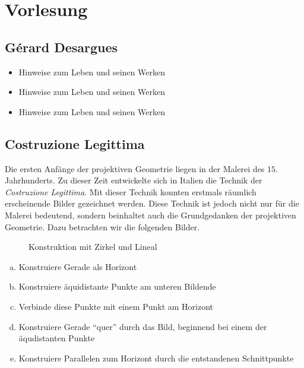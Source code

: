 
\section{Vorlesung}

\subsection*{Gérard Desargues}

\begin{itemize}
    \item Hinweise zum Leben und seinen Werken

    \item Hinweise zum Leben und seinen Werken

    \item Hinweise zum Leben und seinen Werken
\end{itemize} 

\subsection*{Costruzione Legittima}
Die ersten Anfänge der projektiven Geometrie liegen in der Malerei des $15.$ Jahrhunderts.  Zu
dieser Zeit entwickelte sich in Italien die Technik der \textsl{Costruzione Legittima}.  Mit dieser
Technik konnten erstmals räumlich erscheinende Bilder gezeichnet werden. Diese Technik ist jedoch
nicht nur für die Malerei bedeutend, sondern beinhaltet auch die Grundgedanken der projektiven
Geometrie. Dazu betrachten wir die folgenden Bilder. 
\begin{figure}[h]
    
    \caption{Konstruktion mit Zirkel und Lineal}
\end{figure}
\begin{enumerate}[(a)] %
    \item Konstruiere Gerade als Horizont
    \item Konstruiere äquidistante Punkte am unteren Bildende
    \item Verbinde diese Punkte mit einem Punkt am Horizont
    \item Konstruiere Gerade "`quer"' durch das Bild, beginnend bei einem der äqudistanten Punkte
    \item Konstruiere Parallelen zum Horizont durch die entstandenen Schnittpunkte
\end{enumerate}

